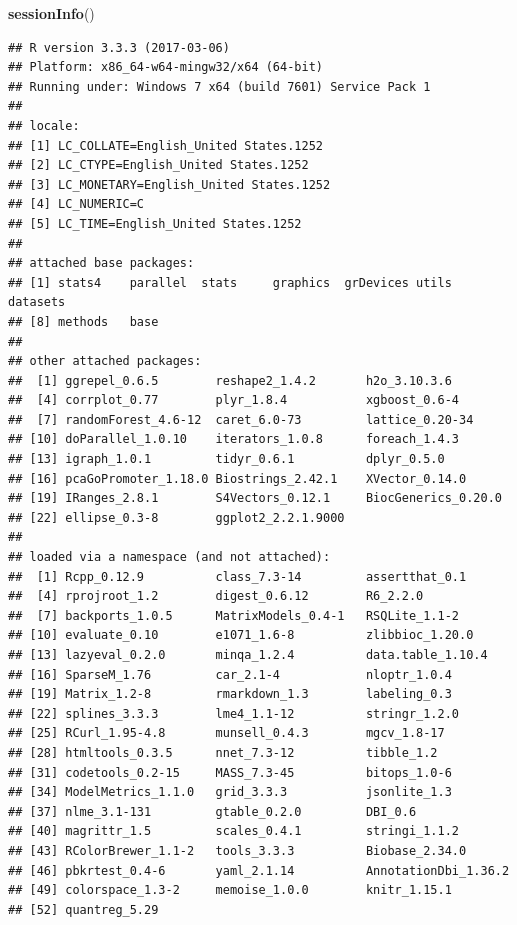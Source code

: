 \documentclass[]{article}
\newenvironment{Shaded}{\begin{snugshade}}{\end{snugshade}}
\newcommand{\KeywordTok}[1]{\textcolor[rgb]{0.13,0.29,0.53}{\textbf{{#1}}}}
\newcommand{\NormalTok}[1]{{#1}}
\begin{document}
\begin{Shaded}
\begin{Highlighting}[]
\KeywordTok{sessionInfo}\NormalTok{()}
\end{Highlighting}
\end{Shaded}

\begin{verbatim}
## R version 3.3.3 (2017-03-06)
## Platform: x86_64-w64-mingw32/x64 (64-bit)
## Running under: Windows 7 x64 (build 7601) Service Pack 1
## 
## locale:
## [1] LC_COLLATE=English_United States.1252 
## [2] LC_CTYPE=English_United States.1252   
## [3] LC_MONETARY=English_United States.1252
## [4] LC_NUMERIC=C                          
## [5] LC_TIME=English_United States.1252    
## 
## attached base packages:
## [1] stats4    parallel  stats     graphics  grDevices utils     datasets 
## [8] methods   base     
## 
## other attached packages:
##  [1] ggrepel_0.6.5        reshape2_1.4.2       h2o_3.10.3.6        
##  [4] corrplot_0.77        plyr_1.8.4           xgboost_0.6-4       
##  [7] randomForest_4.6-12  caret_6.0-73         lattice_0.20-34     
## [10] doParallel_1.0.10    iterators_1.0.8      foreach_1.4.3       
## [13] igraph_1.0.1         tidyr_0.6.1          dplyr_0.5.0         
## [16] pcaGoPromoter_1.18.0 Biostrings_2.42.1    XVector_0.14.0      
## [19] IRanges_2.8.1        S4Vectors_0.12.1     BiocGenerics_0.20.0 
## [22] ellipse_0.3-8        ggplot2_2.2.1.9000  
## 
## loaded via a namespace (and not attached):
##  [1] Rcpp_0.12.9          class_7.3-14         assertthat_0.1      
##  [4] rprojroot_1.2        digest_0.6.12        R6_2.2.0            
##  [7] backports_1.0.5      MatrixModels_0.4-1   RSQLite_1.1-2       
## [10] evaluate_0.10        e1071_1.6-8          zlibbioc_1.20.0     
## [13] lazyeval_0.2.0       minqa_1.2.4          data.table_1.10.4   
## [16] SparseM_1.76         car_2.1-4            nloptr_1.0.4        
## [19] Matrix_1.2-8         rmarkdown_1.3        labeling_0.3        
## [22] splines_3.3.3        lme4_1.1-12          stringr_1.2.0       
## [25] RCurl_1.95-4.8       munsell_0.4.3        mgcv_1.8-17         
## [28] htmltools_0.3.5      nnet_7.3-12          tibble_1.2          
## [31] codetools_0.2-15     MASS_7.3-45          bitops_1.0-6        
## [34] ModelMetrics_1.1.0   grid_3.3.3           jsonlite_1.3        
## [37] nlme_3.1-131         gtable_0.2.0         DBI_0.6             
## [40] magrittr_1.5         scales_0.4.1         stringi_1.1.2       
## [43] RColorBrewer_1.1-2   tools_3.3.3          Biobase_2.34.0      
## [46] pbkrtest_0.4-6       yaml_2.1.14          AnnotationDbi_1.36.2
## [49] colorspace_1.3-2     memoise_1.0.0        knitr_1.15.1        
## [52] quantreg_5.29
\end{verbatim}
\end{document}
